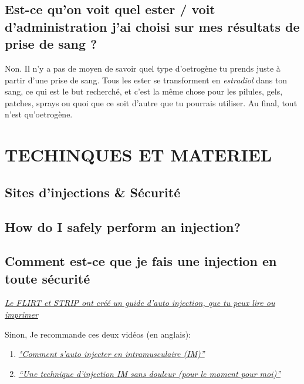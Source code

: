 \documentclass{article}
\begin{document}
\subsection{Est-ce qu'on voit quel ester / voit d'administration j'ai choisi sur mes résultats de prise de sang ?}\label{4-16}

Non. Il n'y a pas de moyen de savoir quel type d'oetrogène tu prends juste à partir d'une prise de sang. Tous les ester se transforment en \textit{estradiol} dans ton sang, ce qui est le but recherché, et c'est la même chose pour les pilules, gels, patches, sprays ou quoi que ce soit d'autre que tu pourrais utiliser. Au final, tout n'est qu'oetrogène. 
 

\section{TECHINQUES ET MATERIEL} \label{ts}

\subsection*{Sites d'injections \& Sécurité}

\subsection{How do I safely perform an injection?}
\subsection{Comment est-ce que je fais une injection en toute sécurité}

\href{https://rebellyon.info/Le-guide-d-auto-injection-sous-cutanee-du-25225}{\textit{Le FLIRT et STRIP ont créé un guide d'auto injection, que tu peux lire ou imprimer}}

Sinon, Je recommande ces deux vidéos (en anglais):

\begin{enumerate}
  \item \href{https://www.youtube.com/watch?v=cBabaGC2Dok}{\textit{"Comment s'auto injecter en intramusculaire (IM)”}}
  \item \href{https://www.youtube.com/watch?v=YfNlAZLxLyw}{\textit{“Une technique d'injection IM sans douleur (pour le moment pour moi)”}}
\end{enumerate}
\end{document}
